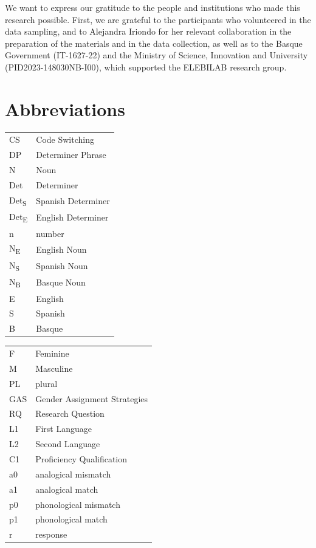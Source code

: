 \documentclass[output=paper]{langscibook}
\begin{document}
We want to express our gratitude to the people and institutions who made this research possible. First, we are grateful to the participants who volunteered in the data sampling, and to Alejandra Iriondo for her relevant collaboration in the preparation of the materials and in the data collection, as well as to the Basque Government (IT-1627-22) and the Ministry of Science, Innovation and University (PID2023-148030NB-I00), which supported the ELEBILAB research group.

\section*{Abbreviations}
\begin{tabularx}{.45\textwidth}{lQ}
 CS  &  Code Switching\\
 DP  &  Determiner Phrase\\
 N  &  Noun\\
 Det  &  Determiner\\
 Det\textsubscript{S}  &  Spanish Determiner\\
 Det\textsubscript{E}  &  English Determiner\\
 n  &  number\\
 N\textsubscript{E}  &  English Noun\\
 N\textsubscript{S}  &  Spanish Noun\\
 N\textsubscript{B}  &  Basque Noun\\
 E  &  English\\
 S  &  Spanish\\
 B  &  Basque\\
 \end{tabularx}
\begin{tabularx}{.45\textwidth}{lQ}
 F  &  Feminine\\
 M  &  Masculine\\
 PL  &  plural\\
 GAS  &  Gender Assignment Strategies\\
 RQ  &  Research Question\\
 L1  &  First Language\\
 L2  &  Second Language\\
 C1  &  Proficiency Qualification\\
 a0  &  analogical mismatch\\
 a1  &  analogical match\\
 p0  &  phonological mismatch\\
 p1  &  phonological match\\
 r  &  response
\end{tabularx}

\sloppy\printbibliography[heading=subbibliography,notkeyword=this]
\end{document}
